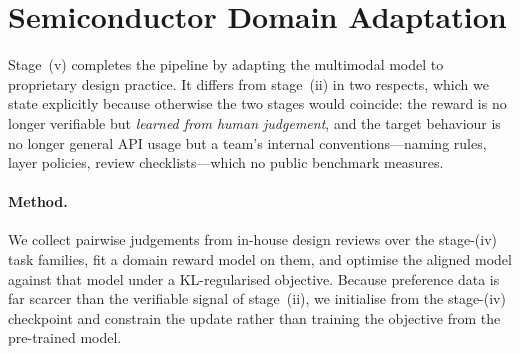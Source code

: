 ﻿%
\section{Semiconductor Domain Adaptation}\label{sec:domain}

Stage~(v) completes the pipeline by adapting the multimodal model to proprietary design practice.
It differs from stage~(ii) in two respects, which we state explicitly because otherwise the two stages would coincide: the reward is no longer verifiable but \emph{learned from human judgement}, and the target behaviour is no longer general API usage but a team's internal conventions---naming rules, layer policies, review checklists---which no public benchmark measures.

\paragraph{Method.}
We collect pairwise judgements from in-house design reviews over the stage-(iv) task families, fit a domain reward model on them, and optimise the aligned model against that model under a KL-regularised objective.
Because preference data is far scarcer than the verifiable signal of stage~(ii), we initialise from the stage-(iv) checkpoint and constrain the update rather than training the objective from the pre-trained model.

